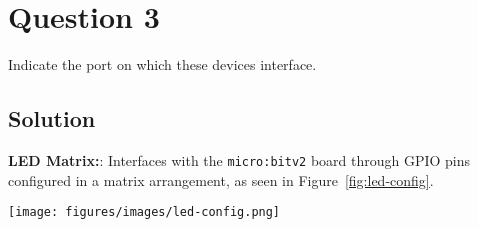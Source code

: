 \section*{Question 3}

Indicate the port on which these devices interface.

\subsection*{Solution}

\textbf{LED Matrix:}: Interfaces with the \texttt{micro:bit\;v2} board through GPIO pins configured in a matrix arrangement, as seen in Figure~\ref{fig:led-config}.

\begin{table}[htbp]
    \centering
    
    \caption{Port configuration of the LED matrix}
\end{table}

\begin{figure*}[htbp]
    \centering
    \texttt{[image: figures/images/led-config.png]}
    \caption{
        LED matrix configuration
    }\label{fig:led-config}
\end{figure*}
